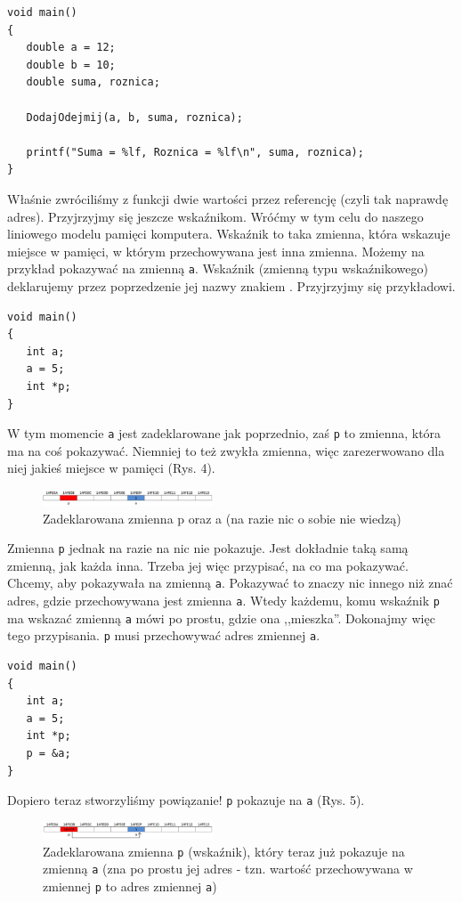 \documentclass{instrukcja}
\begin{document}
\begin{verbatim}
void main()
{
   double a = 12;
   double b = 10;
   double suma, roznica;

   DodajOdejmij(a, b, suma, roznica);

   printf("Suma = %lf, Roznica = %lf\n", suma, roznica);
}
\end{verbatim}
Właśnie zwróciliśmy z funkcji dwie wartości przez referencję (czyli tak naprawdę adres). Przyjrzyjmy się jeszcze wskaźnikom. Wróćmy w tym celu do naszego liniowego modelu pamięci komputera. Wskaźnik to taka zmienna, która wskazuje miejsce w pamięci, w którym przechowywana jest inna zmienna. Możemy na przykład pokazywać na zmienną {\tt a}. Wskaźnik (zmienną typu wskaźnikowego) deklarujemy przez poprzedzenie jej nazwy znakiem {\tt *}. Przyjrzyjmy się przykładowi.
\begin{verbatim}
void main()
{
   int a;
   a = 5;
   int *p;
}
\end{verbatim}
W tym momencie {\tt a} jest zadeklarowane jak poprzednio, zaś {\tt p} to zmienna, która ma na coś pokazywać. Niemniej to też zwykła zmienna, więc zarezerwowano dla niej jakieś miejsce w pamięci (Rys. 4).
\begin{figure}[h!]
\centering
\includegraphics[width=0.45\textwidth]{pamiec4.jpg}
\caption{Zadeklarowana zmienna p oraz a (na razie nic o sobie nie wiedzą)}
\end{figure}

Zmienna {\tt p} jednak na razie na nic nie pokazuje. Jest dokładnie taką samą zmienną, jak każda inna. Trzeba jej więc przypisać, na co ma pokazywać. Chcemy, aby pokazywała na zmienną {\tt a}. Pokazywać to znaczy nic innego niż znać adres, gdzie przechowywana jest zmienna {\tt a}. Wtedy każdemu, komu wskaźnik {\tt p} ma wskazać zmienną {\tt a} mówi po prostu, gdzie ona ,,mieszka''. Dokonajmy więc tego przypisania. {\tt p} musi przechowywać adres zmiennej {\tt a}.
\begin{verbatim}
void main()
{
   int a;
   a = 5;
   int *p;
   p = &a;
}
\end{verbatim}
Dopiero teraz stworzyliśmy powiązanie! {\tt p} pokazuje na {\tt a} (Rys. 5).
\begin{figure}[h!]
\centering
\includegraphics[width=0.45\textwidth]{pamiec5.jpg}
\caption{Zadeklarowana zmienna {\tt p} (wskaźnik), który teraz już pokazuje na zmienną {\tt a} (zna po prostu jej adres - tzn. wartość przechowywana w zmiennej {\tt p} to adres zmiennej {\tt a})}
\end{figure}
\end{document}
